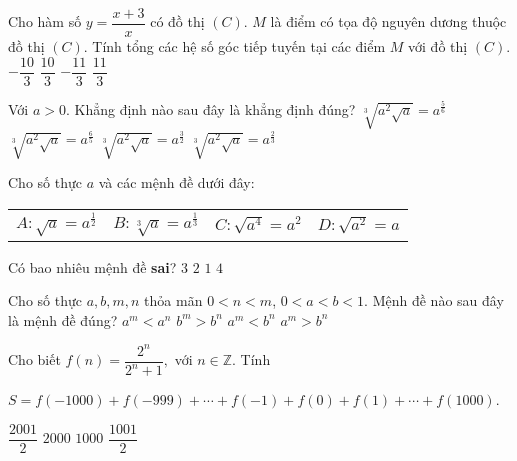 \begin{ex}%
Cho hàm số $y=\dfrac{x+3}{x}$ có đồ thị $(C)$. $M$ là điểm có tọa độ nguyên dương 
thuộc đồ thị $(C)$. Tính tổng các hệ số góc tiếp tuyến tại các điểm $M$ với đồ thị $(C)$.
\choice
{\True $-\dfrac{10}{3}$}
{$\dfrac{10}{3}$}
{$-\dfrac{11}{3}$}
{$\dfrac{11}{3}$}
\end{ex}


\begin{ex}%
Với $a >0$.  Khẳng định nào sau đây là khẳng định đúng?  
\choice
{\True $\sqrt[3]{a^2\sqrt{a}} = a^{\frac{5}{6}}$}
{ $\sqrt[3]{a^2\sqrt{a}} = a^{\frac{6}{5}}$}
{ $\sqrt[3]{a^2\sqrt{a}} = a^{\frac{3}{2}}$}
{ $\sqrt[3]{a^2\sqrt{a}} = a^{\frac{2}{3}}$}
\end{ex}




\begin{ex}%
Cho số thực $a$  và các mệnh đề dưới đây: 
\begin{center}
\begin{tabular}{cccc}
$A: \sqrt{a} = a^{\frac{1}{2}}$&$B: \sqrt[3]{a} = a^{\frac{1}{3}}$&$C: \sqrt{a^4} = a^{2}$&$D: \sqrt{a^2} = a$
\end{tabular} 
\end{center}
Có bao nhiêu mệnh đề {\bf sai}? 
\choice
{\True $3$}
{$2$}
{$1$}
{$4$}
\end{ex}

\begin{ex}%
Cho  số thực $a,b,m,n$  thỏa mãn $0<n<m$, $0<a<b<1.$ Mệnh đề nào sau  đây là mệnh đề đúng? 
\choice
{\True $a^m < a^n$}
{$b^m > b^n$}
{$a^m < b^n$}
{$a^m >b^n$}
\end{ex}


\begin{ex}%
Cho biết $f(n) = \dfrac{2^n}{2^n+1},$ với $n \in \mathbb{Z}$. Tính 
\begin{center}
$S = f(-1000)+f(-999)+\cdots+f(-1)+f(0)+f(1)+\cdots+f(1000)$.
\end{center}  
\choice
{\True $\dfrac{2001}{2}$}
{$2000$}
{$1000$}
{ $\dfrac{1001}{2}$}
\end{ex}




